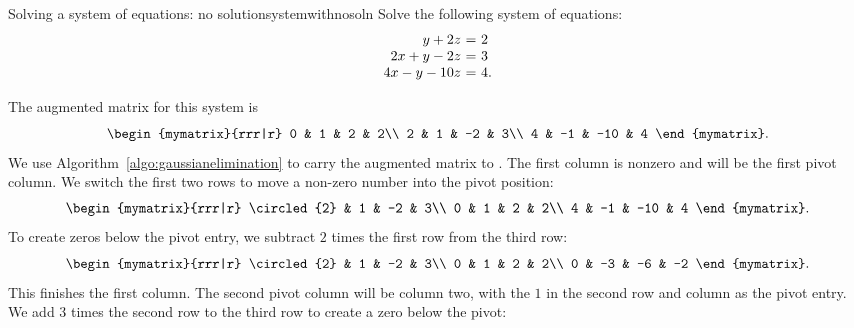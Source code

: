 \begin{example}{Solving a system of equations: no solution}{systemwithnosoln}
  Solve the following system of equations:
  \begin{equation*}
    \begin{array}{r@{~}c@{~}l}
           y  +2z &=& 2\\
      2x  +y  -2z &=& 3\\
      4x  -y -10z &=& 4.
    \end{array}
  \end{equation*}
\end{example}

\begin{solution} The augmented matrix for this system is
  \begin{equation*}
    \begin{mymatrix}{rrr|r}
      0 &  1 &   2 & 2\\
      2 &  1 &  -2 & 3\\
      4 & -1 & -10 & 4      
    \end{mymatrix}.
  \end{equation*}
  We use Algorithm~\ref{algo:gaussianelimination} to carry the
  augmented matrix to {\ef}. The first column is nonzero and will be the
  first pivot column. We switch the first two rows to move a non-zero
  number into the pivot position:
  \begin{equation*}
    \begin{mymatrix}{rrr|r}
      \circled{2} &  1 &  -2 & 3\\
      0 &  1 &   2 & 2\\
      4 & -1 & -10 & 4      
    \end{mymatrix}.
  \end{equation*}
  To create zeros below the pivot entry, we subtract $2$ times the
  first row from the third row:
  \begin{equation*}
    \begin{mymatrix}{rrr|r}
      \circled{2} &  1 &  -2 & 3\\
      0 &  1 &   2 & 2\\
      0 & -3 & -6 & -2      
    \end{mymatrix}.
  \end{equation*}
  This finishes the first column. The second pivot column will be
  column two, with the $1$ in the second row and column as the pivot
  entry. We add $3$ times the second row to the third row to create a
  zero below the pivot:
  \begin{equation*}

\end{equation*}
\end{solution}
